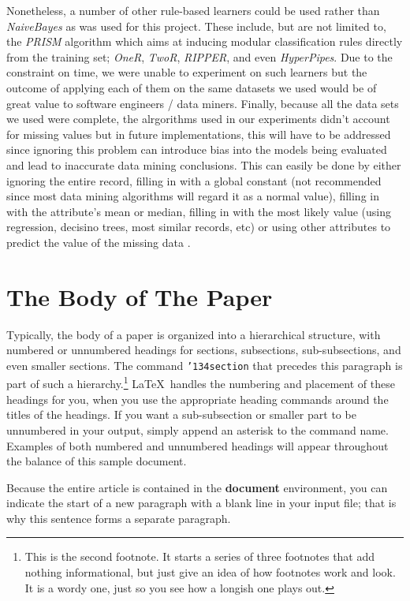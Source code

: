 \documentclass{sig-alternate}
\begin{document}
Nonetheless, a number of other rule-based learners could be used rather than {\em NaiveBayes} as was used for this project. These include, but are not limited to, the {\em PRISM} algorithm which aims at inducing modular classification rules directly from the training set; {\em OneR}, {\em TwoR}, {\em RIPPER}, and even {\em HyperPipes}. Due to the constraint on time, we were unable to experiment on such learners but the outcome of applying each of them on the same datasets we used would be of great value to software engineers / data miners. 
Finally, because all the data sets we used were complete, the alrgorithms used in our experiments didn't account for missing values but in future implementations, this will have to be addressed since ignoring this problem can introduce bias into the models being evaluated and lead to inaccurate data mining conclusions. This can easily be done by either ignoring the entire record, filling in with a global constant (not recommended since most data mining algorithms will regard it as a normal value), filling in with the attribute's mean or median, filling in with the most likely value (using regression, decisino trees, most similar records, etc) or using other attributes to predict the value of the missing data \cite{missingdata}.


\section{The {\secit Body} of The Paper}
Typically, the body of a paper is organized
into a hierarchical structure, with numbered or unnumbered
headings for sections, subsections, sub-subsections, and even
smaller sections.  The command \texttt{{\char'134}section} that
precedes this paragraph is part of such a
hierarchy.\footnote{This is the second footnote.  It
starts a series of three footnotes that add nothing
informational, but just give an idea of how footnotes work
and look. It is a wordy one, just so you see
how a longish one plays out.} \LaTeX\ handles the numbering
and placement of these headings for you, when you use
the appropriate heading commands around the titles
of the headings.  If you want a sub-subsection or
smaller part to be unnumbered in your output, simply append an
asterisk to the command name.  Examples of both
numbered and unnumbered headings will appear throughout the
balance of this sample document.

Because the entire article is contained in
the \textbf{document} environment, you can indicate the
start of a new paragraph with a blank line in your
input file; that is why this sentence forms a separate paragraph.
\end{document}
